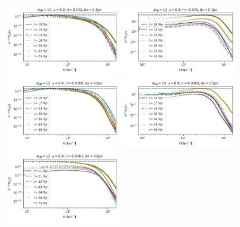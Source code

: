 \documentclass[iop,apj,numberedappendix,twocolappendix]{emulateapj}
\begin{document}
\begin{figure}
\centering
\includegraphics[trim=0.0cm 0.00cm 0.0cm 0.0cm,clip=true,width=0.45\textwidth]{csc_figs/05pcPm0e-3_0Bpower.png}
\includegraphics[trim=0.0cm 0.00cm 0.0cm 0.0cm,clip=true,width=0.45\textwidth]{csc_figs/05pcPm0e-3_0kpower.png}
\includegraphics[trim=0.0cm 0.00cm 0.0cm 0.0cm,clip=true,width=0.45\textwidth]{csc_figs/05pcPm0e-3_3Bpower.png}
\includegraphics[trim=0.0cm 0.00cm 0.0cm 0.0cm,clip=true,width=0.45\textwidth]{csc_figs/05pcPm0e-3_3kpower.png}
\includegraphics[trim=0.0cm 0.00cm 0.0cm 0.0cm,clip=true,width=0.45\textwidth]{csc_figs/05pcPm0e-4_0Bpower.png}

\end{figure}
\end{document}

